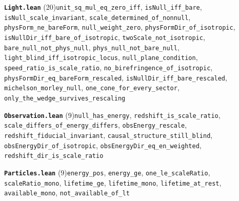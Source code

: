 \documentclass[11pt,a4paper]{article}
\theoremstyle{sudef}
\begin{document}
\noindent\textbf{\texttt{Light.lean}} (20)\quad \texttt{unit\_\allowbreak sq\_\allowbreak mul\_\allowbreak eq\_\allowbreak zero\_\allowbreak iff}, \texttt{isNull\_\allowbreak iff\_\allowbreak bare}, \texttt{isNull\_\allowbreak scale\_\allowbreak invariant}, \texttt{scale\_\allowbreak determined\_\allowbreak of\_\allowbreak nonnull}, \texttt{physForm\_\allowbreak ne\_\allowbreak bareForm}, \texttt{null\_\allowbreak weight\_\allowbreak zero}, \texttt{physFormDir\_\allowbreak of\_\allowbreak isotropic}, \texttt{isNullDir\_\allowbreak iff\_\allowbreak bare\_\allowbreak of\_\allowbreak isotropic}, \texttt{twoScale\_\allowbreak not\_\allowbreak isotropic}, \texttt{bare\_\allowbreak null\_\allowbreak not\_\allowbreak phys\_\allowbreak null}, \texttt{phys\_\allowbreak null\_\allowbreak not\_\allowbreak bare\_\allowbreak null}, \texttt{light\_\allowbreak blind\_\allowbreak iff\_\allowbreak isotropic\_\allowbreak locus}, \texttt{null\_\allowbreak plane\_\allowbreak condition}, \texttt{speed\_\allowbreak ratio\_\allowbreak is\_\allowbreak scale\_\allowbreak ratio}, \texttt{no\_\allowbreak birefringence\_\allowbreak of\_\allowbreak isotropic}, \texttt{physFormDir\_\allowbreak eq\_\allowbreak bareForm\_\allowbreak rescaled}, \texttt{isNullDir\_\allowbreak iff\_\allowbreak bare\_\allowbreak rescaled}, \texttt{michelson\_\allowbreak morley\_\allowbreak null}, \texttt{one\_\allowbreak cone\_\allowbreak for\_\allowbreak every\_\allowbreak sector}, \texttt{only\_\allowbreak the\_\allowbreak wedge\_\allowbreak survives\_\allowbreak rescaling}\par\smallskip
\noindent\textbf{\texttt{Observation.lean}} (9)\quad \texttt{null\_\allowbreak has\_\allowbreak energy}, \texttt{redshift\_\allowbreak is\_\allowbreak scale\_\allowbreak ratio}, \texttt{scale\_\allowbreak differs\_\allowbreak of\_\allowbreak energy\_\allowbreak differs}, \texttt{obsEnergy\_\allowbreak rescale}, \texttt{redshift\_\allowbreak fiducial\_\allowbreak invariant}, \texttt{causal\_\allowbreak structure\_\allowbreak still\_\allowbreak blind}, \texttt{obsEnergyDir\_\allowbreak of\_\allowbreak isotropic}, \texttt{obsEnergyDir\_\allowbreak eq\_\allowbreak en\_\allowbreak weighted}, \texttt{redshift\_\allowbreak dir\_\allowbreak is\_\allowbreak scale\_\allowbreak ratio}\par\smallskip
\noindent\textbf{\texttt{Particles.lean}} (9)\quad \texttt{energy\_\allowbreak pos}, \texttt{energy\_\allowbreak ge}, \texttt{one\_\allowbreak le\_\allowbreak scaleRatio}, \texttt{scaleRatio\_\allowbreak mono}, \texttt{lifetime\_\allowbreak ge}, \texttt{lifetime\_\allowbreak mono}, \texttt{lifetime\_\allowbreak at\_\allowbreak rest}, \texttt{available\_\allowbreak mono}, \texttt{not\_\allowbreak available\_\allowbreak of\_\allowbreak lt}\par\smallskip
\end{document}
